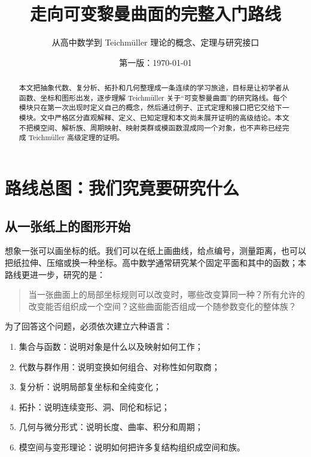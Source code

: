 \documentclass[UTF8,fontset=none,a4paper,11pt]{ctexart}
\title{走向可变黎曼曲面的完整入门路线}
\author{从高中数学到 Teichmüller 理论的概念、定理与研究接口}
\date{第一版：\today}
\theoremstyle{foundation-definition}
\theoremstyle{foundation-theorem}
\theoremstyle{foundation-proposition}
\theoremstyle{foundation-example}
\theoremstyle{foundation-remark}
\theoremstyle{foundation-theorem}
\begin{document}
\maketitle

\begin{abstract}
本文把抽象代数、复分析、拓扑和几何整理成一条连续的学习旅途，目标是让初学者从函数、坐标和图形出发，逐步理解 Teichmüller 关于“可变黎曼曲面”的研究路线。每个模块只在第一次出现时定义自己的概念，然后通过例子、正式定理和接口把它交给下一模块。文中严格区分直观解释、定义、已知定理和本文尚未展开证明的高级结论。本文不把模空间、解析族、周期映射、映射类群或模函数混成同一个对象，也不声称已经完成 Teichmüller 高级定理的证明。
\end{abstract}

\tableofcontents
\clearpage

\section{路线总图：我们究竟要研究什么}

\subsection{从一张纸上的图形开始}

想象一张可以画坐标的纸。我们可以在纸上画曲线，给点编号，测量距离，也可以把纸拉伸、压缩或换一种坐标。高中数学通常研究某个固定平面和其中的函数；本路线更进一步，研究的是：

\begin{quote}
当一张曲面上的局部坐标规则可以改变时，哪些改变算同一种？所有允许的改变能否组织成一个空间？这些曲面能否组成一个随参数变化的整体族？
\end{quote}

为了回答这个问题，必须依次建立六种语言：

\begin{enumerate}[label=(\arabic*)]
  \item 集合与函数：说明对象是什么以及映射如何工作；
  \item 代数与群作用：说明变换如何组合、对称性如何取商；
  \item 复分析：说明局部复坐标和全纯变化；
  \item 拓扑：说明连续变形、洞、同伦和标记；
  \item 几何与微分形式：说明长度、曲率、积分和周期；
  \item 模空间与变形理论：说明如何把许多复结构组织成空间和族。
\end{enumerate}
\end{document}
